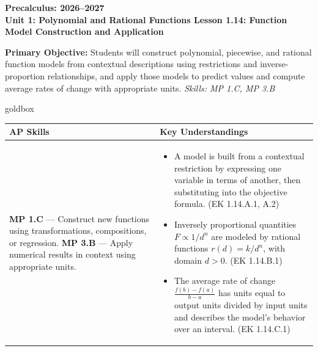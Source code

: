 \documentclass[10pt]{article}
\newcommand{\CourseName}{Precalculus}
\newcommand{\SchoolYear}{2026--2027}
\newcommand{\UnitNumberName}{Unit 1: Polynomial and Rational Functions \quad}
\newcommand{\LessonNumberName}{Lesson 1.14: Function Model Construction and Application}
\begin{document}
\begin{center}
    {\Large\bfseries \CourseName: \SchoolYear \\
    {\small\bfseries \UnitNumberName \LessonNumberName}}
\end{center}

\begin{tcolorbox}[colback=sky, colframe=navy, boxrule=0.9pt, arc=2mm,
    left=2mm, right=2mm, top=1.5mm, bottom=1.5mm]
    \textbf{Primary Objective:} Students will construct polynomial, piecewise, and rational
    function models from contextual descriptions using restrictions and inverse-proportion
    relationships, and apply those models to predict values and compute average rates of change
    with appropriate units.
    \hfill\textit{\small Skills: MP 1.C, MP 3.B}
\end{tcolorbox}

\renewcommand{\arraystretch}{1.6}
\begin{skillbox}{goldbox}
\begin{tabularx}{\linewidth}{@{}X X@{}}
\textbf{AP Skills} &
\textbf{Key Understandings} \\
\midrule
\textbf{MP 1.C} --- Construct new functions using transformations, compositions, or regression. \newline
\textbf{MP 3.B} --- Apply numerical results in context using appropriate units. &
\begin{itemize}[leftmargin=1.2em,itemsep=2pt,topsep=0pt]
  \item A model is built from a contextual restriction by expressing one variable in terms
        of another, then substituting into the objective formula. (EK 1.14.A.1, A.2)
  \item Inversely proportional quantities $F \propto 1/d^n$ are modeled by rational functions
        $r(d) = k/d^n$, with domain $d > 0$. (EK 1.14.B.1)
  \item The average rate of change $\frac{f(b)-f(a)}{b-a}$ has units equal to output units
        divided by input units and describes the model's behavior over an interval. (EK 1.14.C.1)
\end{itemize} \\
\end{tabularx}
\end{skillbox}
\end{document}
